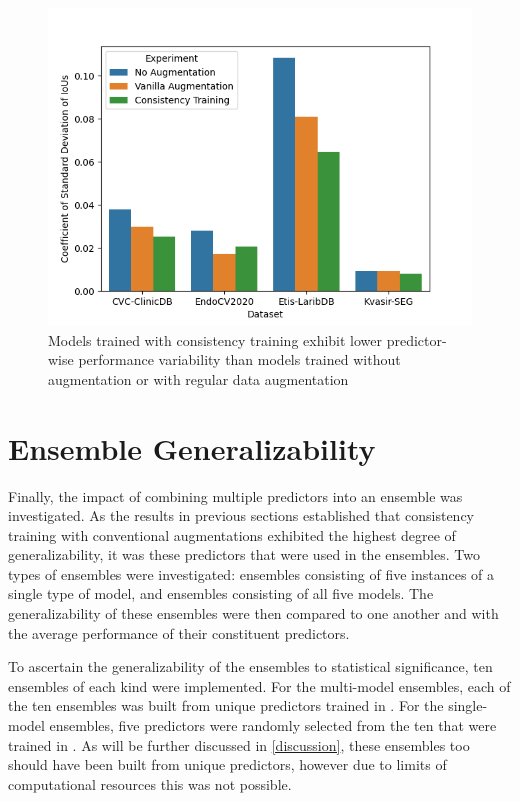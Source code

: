 \begin{figure}[h]
    \centering
    \includegraphics[width=\linewidth]{illustrations/consistency_training_cstd.png}
    \caption[Consistency Training performance variability]{Models trained with consistency training exhibit lower predictor-wise performance variability than models trained without augmentation or with regular data augmentation}
    \label{fig:consistency_cstd}
\end{figure}

\section{Ensemble Generalizability}\label{ensembles}

Finally, the impact of combining multiple predictors into an ensemble was investigated. As the results in previous sections established that consistency training with conventional augmentations exhibited the highest degree of generalizability, it was these predictors that were used in the ensembles. Two types of ensembles were investigated: ensembles consisting of five instances of a single type of model, and ensembles consisting of all five models. The generalizability of these ensembles were then compared to one another and with the average performance of their constituent predictors. 

To ascertain the generalizability of the ensembles to statistical significance, ten ensembles of each kind were implemented. For the multi-model ensembles, each of the ten ensembles was built from unique predictors trained in .  For the single-model ensembles, five predictors were randomly selected from the ten that were trained in . As will be further discussed in \ref{discussion}, these ensembles too should have been built from unique predictors, however due to limits of computational resources this was not possible. 

